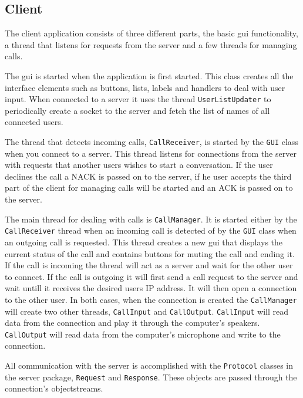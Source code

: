 \documentclass[a4paper,titlepage]{article}
\newcommand{\code}{\texttt}
\begin{document}
\subsection*{Client}
The client application consists of three different parts, the basic gui functionality, a thread that listens for requests from the server and a few threads for managing calls.

The gui is started when the application is first started. This class creates all the interface elements such as buttons, lists, labels and handlers to deal with user input. When connected to a server it uses the thread \code{UserListUpdater} to periodically create a socket to the server and fetch the list of names of all connected users.

The thread that detects incoming calls, \code{CallReceiver}, is started by the \code{GUI} class when you connect to a server. This thread listens for connections from the server with requests that another users wishes to start a conversation. If the user declines the call a NACK is passed on to the server, if he user accepts the third part of the client for managing calls will be started and an ACK is passed on to the server.

The main thread for dealing with calls is \code{CallManager}. It is started either by the \code{CallReceiver} thread when an incoming call is detected of by the \code{GUI} class when an outgoing call is requested. This thread creates a new gui that displays the current status of the call and contains buttons for muting the call and ending it. If the call is incoming the thread will act as a server and wait for the other user to connect. If the call is outgoing it will first send a call request to the server and wait untill it receives the desired users IP address. It will then open a connection to the other user. In both cases, when the connection is created the \code{CallManager} will create two other threads, \code{CallInput} and \code{CallOutput}. \code{CallInput} will read data from the connection and play it through the computer's speakers. \code{CallOutput} will read data from the computer's microphone and write to the connection.

All communication with the server is accomplished with the \code{Protocol} classes in the server package, \code{Request} and \code{Response}. These objects are passed through the connection's objectstreams.
\end{document}

